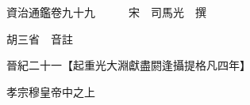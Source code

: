 










 


 
 


 

  
  
  
  
  





  
  
  
  
  
 
  

  

  
  
  



  

 
 

  
   




  

  
  


  　　資治通鑑卷九十九　　　宋　司馬光　撰

　　胡三省　音註

　　晉紀二十一【起重光大淵獻盡閼逢攝提格凡四年】

　　孝宗穆皇帝中之上

